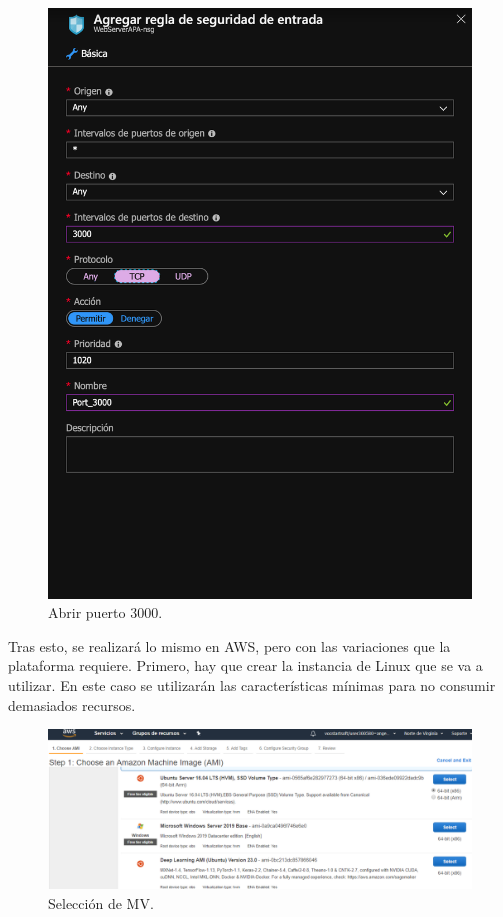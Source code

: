 \documentclass[english,runningheads,a4paper]{llncs}[2018/03/10]
\begin{document}
\begin{figure}[h!]
 \includegraphics[width=\linewidth]{./Web/Azure/Azure3.png}
 \caption{Abrir puerto 3000.}
\end{figure}

Tras esto, se realizará lo mismo en AWS, pero con las variaciones que la plataforma
requiere. Primero, hay que crear la instancia de Linux que se va a utilizar. En
este caso se utilizarán las características mínimas para no consumir demasiados
recursos.

\begin{figure}[h!]
 \includegraphics[width=\linewidth]{./Web/AWS/AWS1.png}
 \caption{Selección de MV.}
\end{figure}
\end{document}
